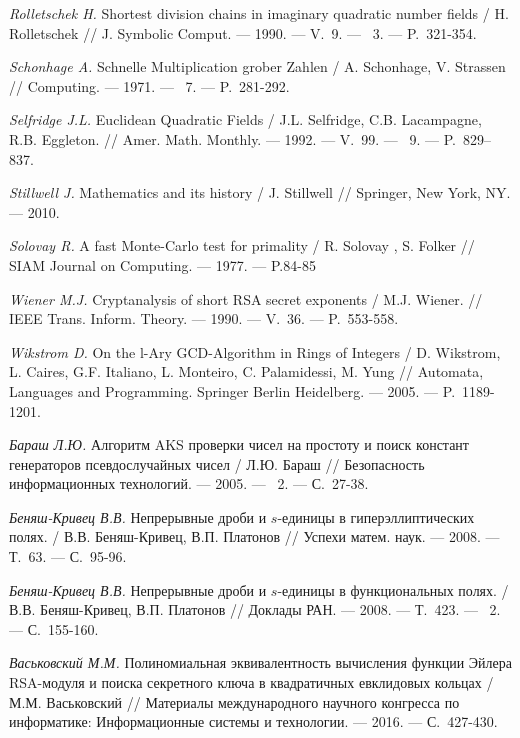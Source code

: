\begin{thebibliography}{99}
    \textit{Rolletschek H.} Shortest division chains in imaginary quadratic number fields / H. Rolletschek // J. Symbolic Comput. --- 1990. --- V.~9. --- {\textnumero}~3. --- P.~321-354.

    \textit{Schonhage A.} Schnelle Multiplication grober Zahlen / A. Schonhage, V. Strassen // Computing. --- 1971. --- {\textnumero}~7. --- P.~281-292.

    \textit{Selfridge J.L.} Euclidean Quadratic Fields / J.L. Selfridge, C.B. Lacampagne, R.B. Eggleton. // Amer. Math. Monthly. --- 1992. --- V.~99. --- {\textnumero}~9. --- P.~829--837.

    \textit{Stillwell J.} Mathematics and its history / J. Stillwell // Springer, New York, NY. --- 2010.

    \textit{Solovay R.} A fast Monte-Carlo test for primality / R. Solovay , S. Folker // SIAM Journal on Computing. --- 1977. --- P.84-85
    
    \textit{Wiener M.J.} Cryptanalysis of short RSA secret exponents / M.J. Wiener. // IEEE Trans. Inform. Theory. --- 1990. --- V.~36. --- P.~553-558.

    \textit{Wikstrom D.} On the l-Ary GCD-Algorithm in Rings of Integers / D. Wikstrom, L. Caires, G.F. Italiano, L. Monteiro, C. Palamidessi, M. Yung // Automata, Languages and Programming. Springer Berlin Heidelberg. --- 2005. --- P.~1189-1201.

    \textit{Бараш Л.Ю.} Алгоритм AKS проверки чисел на простоту и поиск констант генераторов псевдослучайных чисел / Л.Ю. Бараш // Безопасность информационных технологий. --- 2005. --- \textnumero~2. --- С.~27-38.

    \textit{Беняш-Кривец В.В.} Непрерывные дроби и $s$-единицы в гиперэллиптических полях. / В.В. Беняш-Кривец, В.П. Платонов // Успехи матем. наук. --- 2008. --- Т.~63. --- С.~95-96.
    
    \textit{Беняш-Кривец В.В.} Непрерывные дроби и $s$-единицы в функциональных полях. / В.В. Беняш-Кривец, В.П. Платонов // Доклады РАН. --- 2008. --- Т.~423. --- \textnumero~2. --- С.~155-160.

    \textit{Васьковский М.М.} Полиномиальная эквивалентность вычисления функции Эйлера RSA-модуля и поиска секретного ключа в квадратичных евклидовых кольцах / М.М. Васьковский // Материалы международного научного конгресса по информатике: Информационные системы и технологии. --- 2016. --- С.~427-430.


\end{thebibliography}
